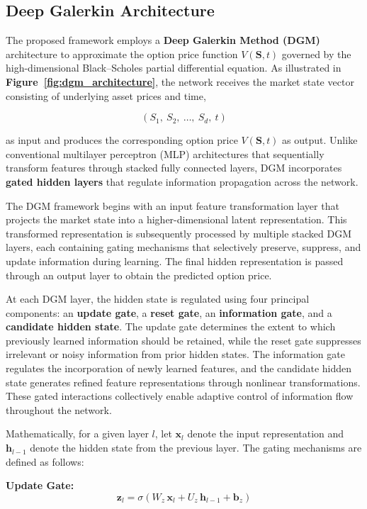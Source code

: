 \documentclass[12pt, a4paper]{article}
\begin{document}
\subsection{Deep Galerkin Architecture}

The proposed framework employs a \textbf{Deep Galerkin Method (DGM)}
architecture to approximate the option price function $V(\mathbf{S},t)$
governed by the high-dimensional Black--Scholes partial differential
equation. As illustrated in \textbf{Figure~\ref{fig:dgm_architecture}},
the network receives the market state vector consisting of underlying
asset prices and time,

\[
    (S_1,\ S_2,\ \ldots,\ S_d,\ t)
\]

as input and produces the corresponding option price $V(\mathbf{S},t)$
as output. Unlike conventional multilayer perceptron (MLP) architectures
that sequentially transform features through stacked fully connected
layers, DGM incorporates \textbf{gated hidden layers} that regulate
information propagation across the network.

The DGM framework begins with an input feature transformation layer
that projects the market state into a higher-dimensional latent
representation. This transformed representation is subsequently
processed by multiple stacked DGM layers, each containing gating
mechanisms that selectively preserve, suppress, and update information
during learning. The final hidden representation is passed through an
output layer to obtain the predicted option price.

At each DGM layer, the hidden state is regulated using four principal
components: an \textbf{update gate}, a \textbf{reset gate}, an
\textbf{information gate}, and a \textbf{candidate hidden state}. The
update gate determines the extent to which previously learned
information should be retained, while the reset gate suppresses
irrelevant or noisy information from prior hidden states. The
information gate regulates the incorporation of newly learned features,
and the candidate hidden state generates refined feature representations
through nonlinear transformations. These gated interactions collectively
enable adaptive control of information flow throughout the network.

Mathematically, for a given layer $l$, let $\mathbf{x}_l$ denote the
input representation and $\mathbf{h}_{l-1}$ denote the hidden state
from the previous layer. The gating mechanisms are defined as follows:

\medskip
\noindent\textbf{Update Gate:}
\begin{equation}
    \mathbf{z}_l = \sigma(W_z\,\mathbf{x}_l + U_z\,\mathbf{h}_{l-1} + \mathbf{b}_z)
    \label{eq:update_gate}
\end{equation}
\end{document}
